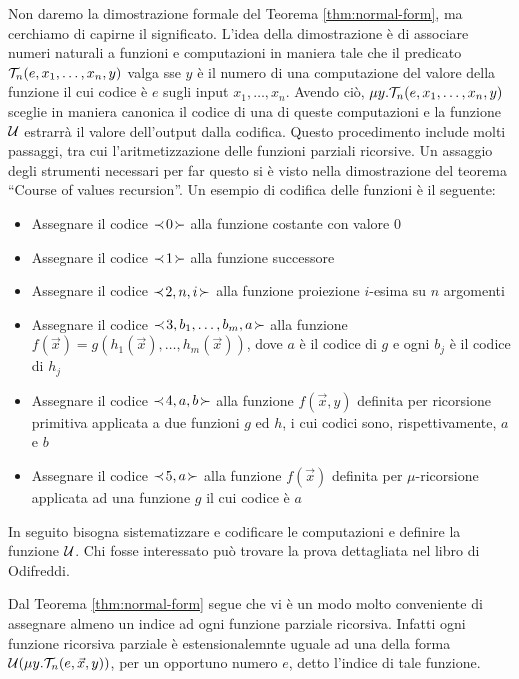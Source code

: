 \documentclass[runningheads,a4paper]{llncs}
\begin{document}
Non daremo la dimostrazione formale del Teorema \ref{thm:normal-form}, ma cerchiamo di capirne il significato.
 L'idea della dimostrazione \`{e} di associare numeri naturali a funzioni e computazioni in maniera tale che il predicato
 $\mathcal{T}_n(e,x_1,\ldots,x_n,y)$ valga sse $y$ \`{e} il numero di una computazione del valore della funzione il cui codice \`{e} $e$
 sugli input $x_1,\ldots,x_n$. Avendo ci\`{o}, $\mu y.\mathcal{T}_n(e,x_1,\ldots,x_n,y)$ sceglie in maniera canonica 
 il codice di una di queste computazioni e la funzione $\mathcal{U}$ estrarr\`{a} il valore dell'output dalla codifica.
 Questo procedimento include molti passaggi, tra cui l'aritmetizzazione delle funzioni parziali ricorsive.
 Un assaggio degli strumenti necessari per far questo si \`{e} visto nella dimostrazione del teorema ``Course of values recursion''.
 Un esempio di codifica delle funzioni \`{e} il seguente:
\begin{itemize}
\item Assegnare il codice $\prec\! 0 \!\succ$ alla funzione costante con valore $0$
\item Assegnare il codice $\prec\! 1 \!\succ$ alla funzione successore
\item Assegnare il codice $\prec\! 2,n,i \!\succ$ alla funzione proiezione $i$-esima su $n$ argomenti
\item Assegnare il codice $\prec\! 3,b_1,\ldots,b_m,a \!\succ$ alla funzione $f(\vec x) = g(h_1(\vec x),\ldots,h_m(\vec x))$, dove 
 $a$ \`{e} il codice di $g$ e ogni $b_j$ \`{e} il codice di $h_j$
\item Assegnare il codice $\prec\! 4,a,b \!\succ$ alla funzione $f(\vec x,y)$ definita per ricorsione primitiva applicata a due funzioni
 $g$ ed $h$, i cui codici sono, rispettivamente, $a$ e $b$
\item Assegnare il codice $\prec\! 5,a \!\succ$ alla funzione $f(\vec x)$ definita per $\mu$-ricorsione applicata ad una funzione
 $g$ il cui codice \`{e} $a$
\end{itemize}

In seguito bisogna sistematizzare e codificare le computazioni e definire la funzione $\mathcal{U}$. Chi fosse interessato pu\`{o}
 trovare la prova dettagliata nel libro di Odifreddi.

Dal Teorema \ref{thm:normal-form} segue che vi \`{e} un modo molto conveniente di assegnare almeno un indice ad ogni funzione
 parziale ricorsiva. Infatti ogni funzione ricorsiva parziale \`{e} estensionalemnte uguale ad una della forma
 $\mathcal{U}(\mu y.\mathcal{T}_n(e,\vec x,y))$, per un opportuno numero $e$, detto l'indice di tale funzione.
\end{document}
